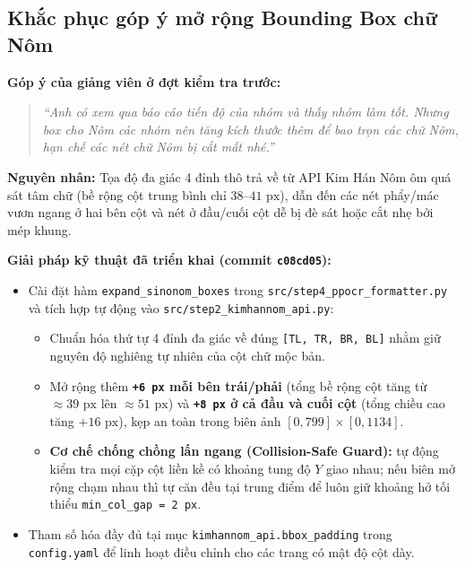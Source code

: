 \documentclass[12pt,a4paper]{article}
\begin{document}
\subsection{Khắc phục góp ý mở rộng Bounding Box chữ Nôm}
\textbf{Góp ý của giảng viên ở đợt kiểm tra trước:}
\begin{quote}
\itshape ``Anh có xem qua báo cáo tiến độ của nhóm và thấy nhóm làm tốt. Nhưng box cho Nôm các nhóm nên tăng kích thước thêm để bao trọn các chữ Nôm, hạn chế các nét chữ Nôm bị cắt mất nhé.''
\end{quote}

\textbf{Nguyên nhân:} Tọa độ đa giác 4 đỉnh thô trả về từ API Kim Hán Nôm ôm quá sát tâm chữ (bề rộng cột trung bình chỉ $38$--$41\text{ px}$), dẫn đến các nét phẩy/mác vươn ngang ở hai bên cột và nét ở đầu/cuối cột dễ bị đè sát hoặc cắt nhẹ bởi mép khung.

\textbf{Giải pháp kỹ thuật đã triển khai (commit \texttt{c08cd05}):}
\begin{itemize}[leftmargin=1.5em, itemsep=0.25em]
    \item Cài đặt hàm \texttt{expand\_sinonom\_boxes} trong \texttt{src/step4\_ppocr\_formatter.py} và tích hợp tự động vào \texttt{src/step2\_kimhannom\_api.py}:
    \begin{itemize}[leftmargin=1.5em]
        \item Chuẩn hóa thứ tự 4 đỉnh đa giác về đúng \texttt{[TL, TR, BR, BL]} nhằm giữ nguyên độ nghiêng tự nhiên của cột chữ mộc bản.
        \item Mở rộng thêm \textbf{\texttt{+6 px} mỗi bên trái/phải} (tổng bề rộng cột tăng từ $\approx 39\text{ px}$ lên $\approx 51\text{ px}$) và \textbf{\texttt{+8 px} ở cả đầu và cuối cột} (tổng chiều cao tăng $+16\text{ px}$), kẹp an toàn trong biên ảnh $[0, 799] \times [0, 1134]$.
        \item \textbf{Cơ chế chống chồng lấn ngang (Collision-Safe Guard):} tự động kiểm tra mọi cặp cột liền kề có khoảng tung độ $Y$ giao nhau; nếu biên mở rộng chạm nhau thì tự căn đều tại trung điểm để luôn giữ khoảng hở tối thiểu \texttt{min\_col\_gap = 2 px}.
    \end{itemize}
    \item Tham số hóa đầy đủ tại mục \texttt{kimhannom\_api.bbox\_padding} trong \texttt{config.yaml} để linh hoạt điều chỉnh cho các trang có mật độ cột dày.
\end{itemize}
\end{document}
